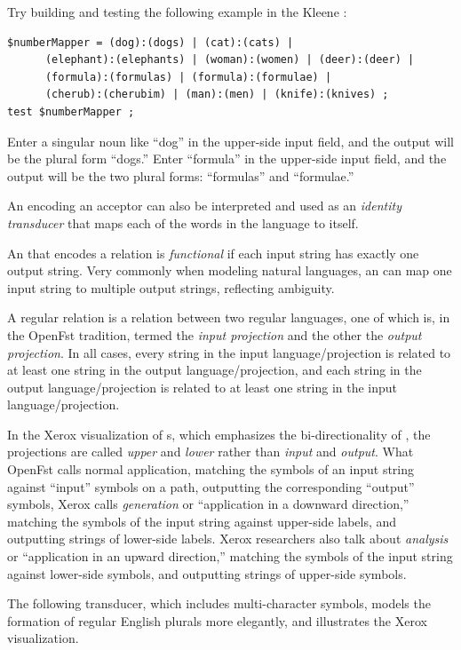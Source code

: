 Try building and testing the following example in the Kleene \gui{}:


\begin{Verbatim}
$numberMapper = (dog):(dogs) | (cat):(cats) | 
      (elephant):(elephants) | (woman):(women) | (deer):(deer) |
      (formula):(formulas) | (formula):(formulae) |
      (cherub):(cherubim) | (man):(men) | (knife):(knives) ;
test $numberMapper ;
\end{Verbatim}

\noindent
Enter a singular noun like ``dog'' in the upper-side input field, and the output
will be the plural form ``dogs.''  Enter ``formula'' in the upper-side input
field, and the output will be the two plural forms:  ``formulas'' and
``formulae.''  


An \fsm{} encoding an acceptor can also be interpreted and used as an \emph{identity transducer}
that maps each of the words in the language to itself.

An \fst{} that encodes a relation is \emph{functional} if each input string has exactly one
output string.  Very commonly when modeling natural languages, an \fst{} can map one input
string to multiple output strings, reflecting ambiguity. 

A regular relation is a relation between two regular languages, one of which is, in the
OpenFst tradition, termed the
\emph{input projection} and the other the \emph{output projection}.  In all cases, every
string in the input language/projection is related to at least one
string in the output language/projection, and each string in the output language/projection is related to at
least one string in the input language/projection.

In the Xerox
visualization of \fst{}s, which emphasizes the bi-directionality of , the projections
are called \emph{upper} and \emph{lower} rather than \emph{input} and \emph{output}.  
What OpenFst calls normal application, matching the symbols
of an input string against ``input'' symbols on a path, outputting the corresponding
``output'' symbols, Xerox calls \emph{generation} or ``application in a downward
direction,'' matching the symbols of the input string against upper-side labels, and
outputting strings of lower-side labels.  Xerox
researchers also talk about \emph{analysis} or ``application in an upward direction,'' matching the symbols of
the input string against lower-side symbols, and outputting strings of upper-side symbols.  

The following transducer, which includes multi-character symbols,
models the formation of regular English plurals more elegantly, and illustrates the Xerox
visualization.

